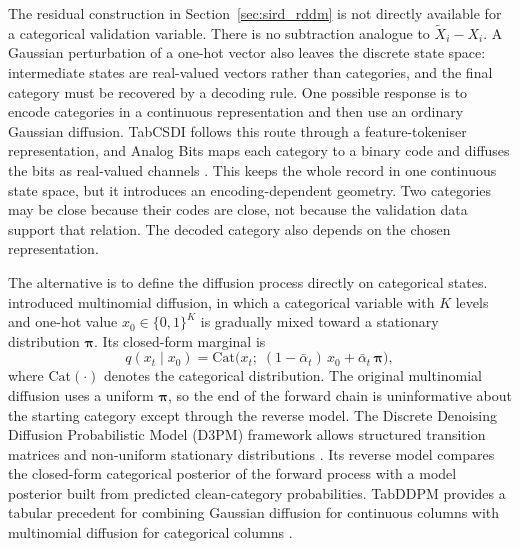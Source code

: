 The residual construction in Section~\ref{sec:sird_rddm} is not directly available for a categorical validation variable. There is no subtraction analogue to \(\tilde X_i-X_i\). A Gaussian perturbation of a one-hot vector also leaves the discrete state space: intermediate states are real-valued vectors rather than categories, and the final category must be recovered by a decoding rule. One possible response is to encode categories in a continuous representation and then use an ordinary Gaussian diffusion. TabCSDI follows this route through a feature-tokeniser representation, and Analog Bits maps each category to a binary code and diffuses the bits as real-valued channels \citep{chen2023analog}. This keeps the whole record in one continuous state space, but it introduces an encoding-dependent geometry. Two categories may be close because their codes are close, not because the validation data support that relation. The decoded category also depends on the chosen representation.

The alternative is to define the diffusion process directly on categorical states. \citet{hoogeboom2021multinomial} introduced multinomial diffusion, in which a categorical variable with \(K\) levels and one-hot value \(x_0\in\{0,1\}^K\) is gradually mixed toward a stationary distribution \(\boldsymbol{\pi}\). Its closed-form marginal is
\begin{equation}
q(x_t \mid x_0) = \mathrm{Cat}\bigl(x_t;\; (1 - \bar{\alpha}_t)\, x_0 + \bar{\alpha}_t\, \boldsymbol{\pi}\bigr),
\label{eq:multinomial_forward}
\end{equation}
where \(\mathrm{Cat}(\cdot)\) denotes the categorical distribution. The original multinomial diffusion uses a uniform \(\boldsymbol{\pi}\), so the end of the forward chain is uninformative about the starting category except through the reverse model. The Discrete Denoising Diffusion Probabilistic Model (D3PM) framework allows structured transition matrices and non-uniform stationary distributions \citep{austin2021structured}. Its reverse model compares the closed-form categorical posterior of the forward process with a model posterior built from predicted clean-category probabilities. TabDDPM provides a tabular precedent for combining Gaussian diffusion for continuous columns with multinomial diffusion for categorical columns \citep{kotelnikov2023tabddpm}.

